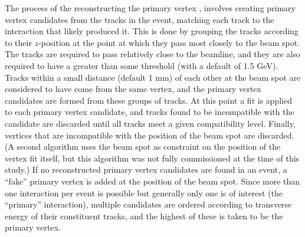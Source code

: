 The process of the reconstructing the primary vertex 
\cite{CMS-NOTE-2006-026}, 
\cite{CMS-NOTE-2006-029} 
involves creating primary vertex candidates
from the tracks in the event,
matching each track to the interaction
that likely produced it.
This is done by grouping the tracks according 
to their $z$-position at the point at which they pass 
most closely to the beam spot.  
The tracks are required to pass relatively close 
to the beamline, 
and they are also required to have a \pt greater 
than some threshold (with a default of 1.5 GeV).  
Tracks within a small distance (default 1 mm) of each other 
at the beam spot are considered to have come from 
the same vertex, 
and the primary vertex candidates are formed from these 
groups of tracks.  
At this point a fit is applied to each primary vertex candidate, 
and tracks found to be incompatible with the candidate are discarded 
until all tracks meet a given compatibility level.  
Finally, vertices that are incompatible with the position 
of the beam spot are discarded.  
(A second algorithm uses the beam spot as constraint on the 
position of the vertex fit itself, 
but this algorithm was not fully commissioned at the time 
of this study.)  
If no reconstructed primary vertex candidates are found in 
an event, 
a ``fake'' primary vertex is added at the position 
of the beam spot.  
Since more than one interaction per event is possible 
but generally only one is of interest (the ``primary'' interaction), 
multiple candidates are ordered according to transverse energy of 
their constituent tracks, 
and the highest of these is taken to be the primary vertex.  

\clearpage
